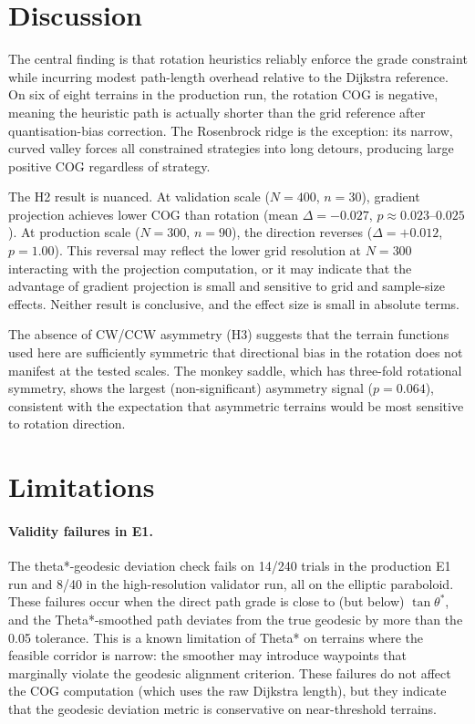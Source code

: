 \documentclass[11pt,a4paper]{article}
\begin{document}
\section{Discussion}
\label{sec:discussion}

The central finding is that rotation heuristics reliably enforce the grade
constraint while incurring modest path-length overhead relative to the Dijkstra
reference.
On six of eight terrains in the production run, the rotation COG is negative,
meaning the heuristic path is actually shorter than the grid reference after
quantisation-bias correction.
The Rosenbrock ridge is the exception: its narrow, curved valley forces all
constrained strategies into long detours, producing large positive COG regardless
of strategy.

The H2 result is nuanced.
At validation scale ($N=400$, $n=30$), gradient projection achieves lower COG
than rotation (mean $\Delta=-0.027$, $p\approx0.023$--$0.025$).
At production scale ($N=300$, $n=90$), the direction reverses ($\Delta=+0.012$,
$p=1.00$).
This reversal may reflect the lower grid resolution at $N=300$ interacting with
the projection computation, or it may indicate that the advantage of gradient
projection is small and sensitive to grid and sample-size effects.
Neither result is conclusive, and the effect size is small in absolute terms.

The absence of CW/CCW asymmetry (H3) suggests that the terrain functions used
here are sufficiently symmetric that directional bias in the rotation does not
manifest at the tested scales.
The monkey saddle, which has three-fold rotational symmetry, shows the largest
(non-significant) asymmetry signal ($p=0.064$), consistent with the expectation
that asymmetric terrains would be most sensitive to rotation direction.

\section{Limitations}
\label{sec:limitations}

\paragraph{Validity failures in E1.}
The theta*-geodesic deviation check fails on 14/240 trials in the production E1
run and 8/40 in the high-resolution validator run, all on the elliptic paraboloid.
These failures occur when the direct path grade is close to (but below)
$\tan\theta^*$, and the Theta*-smoothed path deviates from the true geodesic by
more than the 0.05 tolerance.
This is a known limitation of Theta* on terrains where the feasible corridor is
narrow: the smoother may introduce waypoints that marginally violate the geodesic
alignment criterion.
These failures do not affect the COG computation (which uses the raw Dijkstra
length), but they indicate that the geodesic deviation metric is conservative on
near-threshold terrains.
\end{document}
